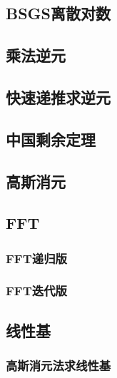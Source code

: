 \documentclass[10pt,a4paper]{article}
\begin{document}
\subsection{BSGS离散对数}

\subsection{乘法逆元}
\begin{spacing}{1.5}

\end{spacing}

\subsection{快速递推求逆元}
\begin{spacing}{1.5}

\end{spacing}

\subsection{中国剩余定理}
\begin{spacing}{1.5}

\end{spacing}

\subsection{高斯消元}
\begin{spacing}{1.5}

\end{spacing}

\subsection{FFT}
\subsubsection{FFT递归版}

\subsubsection{FFT迭代版}

\subsection{线性基}
\subsubsection{高斯消元法求线性基}
\begin{spacing}{1.5}

\end{spacing}

\end{document}
